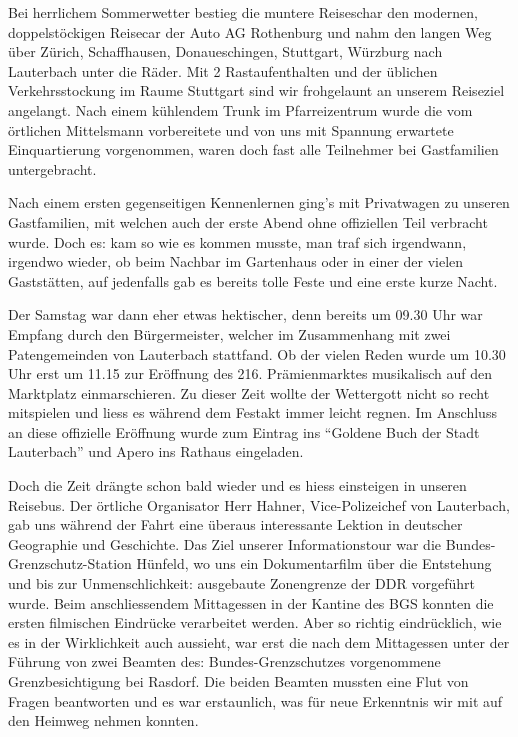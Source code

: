 \begin{history}
\begin{itemize}
        Bei herrlichem Sommerwetter bestieg die muntere Reiseschar den modernen,
        doppelstöckigen Reisecar der Auto AG Rothenburg und nahm den langen Weg
        über Zürich, Schaffhausen, Donaueschingen, Stuttgart, Würzburg nach
        Lauterbach unter die Räder. Mit 2 Rastaufenthalten und der üblichen
        Verkehrsstockung im Raume Stuttgart sind wir frohgelaunt an unserem
        Reiseziel angelangt. Nach einem kühlendem Trunk im Pfarreizentrum wurde
        die vom örtlichen Mittelsmann vorbereitete und von uns mit Spannung
        erwartete Einquartierung vorgenommen, waren doch fast alle Teilnehmer
        bei Gastfamilien untergebracht.

        Nach einem ersten gegenseitigen Kennenlernen ging's mit Privatwagen zu
        unseren Gastfamilien, mit welchen auch der erste Abend ohne offiziellen
        Teil verbracht wurde. Doch es: kam so wie es kommen musste, man traf
        sich irgendwann, irgendwo wieder, ob beim Nachbar im Gartenhaus oder in
        einer der vielen Gaststätten, auf jedenfalls gab es bereits tolle Feste
        und eine erste kurze Nacht.

        Der Samstag war dann eher etwas hektischer, denn bereits um 09.30 Uhr
        war Empfang durch den Bürgermeister, welcher im Zusammenhang mit zwei
        Patengemeinden von Lauterbach stattfand. Ob der vielen Reden wurde um
        10.30 Uhr erst um 11.15 zur Eröffnung des 216. Prämienmarktes
        musikalisch auf den Marktplatz einmarschieren. Zu dieser Zeit wollte der
        Wettergott nicht so recht mitspielen und liess es während dem Festakt
        immer leicht regnen. Im Anschluss an diese offizielle Eröffnung wurde
        zum Eintrag ins \enquote{Goldene Buch der Stadt Lauterbach} und Apero
        ins Rathaus eingeladen.

        Doch die Zeit drängte schon bald wieder und es hiess einsteigen in
        unseren Reisebus. Der örtliche Organisator Herr Hahner, Vice-Polizeichef
        von Lauterbach, gab uns während der Fahrt eine überaus interessante
        Lektion in deutscher Geographie und Geschichte. Das Ziel unserer
        Informationstour war die Bundes-Grenzschutz-Station Hünfeld, wo uns ein
        Dokumentarfilm über die Entstehung und bis zur Unmenschlichkeit:
        ausgebaute Zonengrenze der DDR vorgeführt wurde. Beim anschliessendem
        Mittagessen in der Kantine des BGS konnten die ersten filmischen
        Eindrücke verarbeitet werden. Aber so richtig eindrücklich, wie es in
        der Wirklichkeit auch aussieht, war erst die nach dem Mittagessen unter
        der Führung von zwei Beamten des: Bundes-Grenzschutzes vorgenommene
        Grenzbesichtigung bei Rasdorf. Die beiden Beamten mussten eine Flut von
        Fragen beantworten und es war erstaunlich, was für neue Erkenntnis wir
        mit auf den Heimweg nehmen konnten.


\end{itemize}
\end{history}

